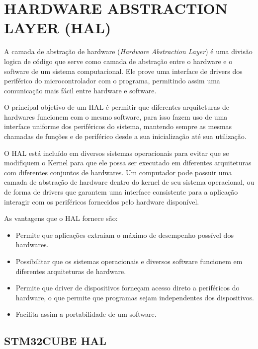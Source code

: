

\section{HARDWARE ABSTRACTION LAYER (HAL)}
A camada de abstração de hardware (\textit{Hardware Abstraction Layer}) é uma divisão logica de código que serve como camada de abstração entre o hardware e o software de um sistema computacional. Ele prove uma interface de drivers dos periférico do microcontrolador com o programa, permitindo assim uma comunicação mais fácil entre hardware e software.

O principal objetivo de um HAL é permitir que diferentes arquiteturas de hardwares funcionem com o mesmo software, para isso fazem uso de uma interface uniforme dos periféricos do sistema, mantendo sempre as mesmas chamadas de funções e de periférico desde a sua inicialização até sua utilização.

O HAL está incluído em diversos sistemas operacionais para evitar que se modifiquem o Kernel para que ele possa ser executado em diferentes arquiteturas com diferentes conjuntos de hardwares. Um computador pode possuir uma camada de abstração de hardware dentro do kernel de seu sistema operacional, ou de forma de drivers que garantem uma interface consistente para a aplicação interagir com os periféricos fornecidos pelo hardware disponível.

As vantagens que o HAL fornece são:
\begin{itemize}
    \item Permite que aplicações extraiam o máximo de desempenho possível dos hardwares.
    \item Possibilitar que os sistemas operacionais e diversos software funcionem em diferentes arquiteturas de hardware.
    \item Permite que driver de dispositivos forneçam acesso direto a periféricos do hardware, o que permite que programas sejam independentes dos dispositivos.
    \item Facilita assim a portabilidade de um software.
\end{itemize}

\subsection{STM32CUBE HAL} 

